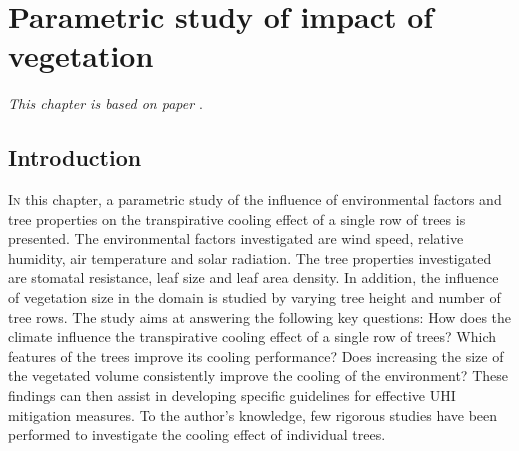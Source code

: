 \chapter{Parametric study of impact of vegetation}
\label{ch:parametricstudy}
\def\figdir{chapters/ch03_numericalmodelsimple/figures}

\textit{This chapter is based on paper \cite{Manickathan2018a}}.
	

\section{Introduction}


\lettrine[lines=3,nindent=0em,loversize=0.1]{I}{n} this chapter, a parametric study of the influence of environmental factors and tree properties on the transpirative cooling effect of a single row of trees is presented. The environmental factors investigated are wind speed, relative humidity, air temperature and solar radiation. The tree properties investigated are stomatal resistance, leaf size and leaf area density. In addition, the influence of vegetation size in the domain is studied by varying tree height and number of tree rows. The study aims at answering the following key questions: How does the climate influence the transpirative cooling effect of a single row of trees? Which features of the trees improve its cooling performance? Does increasing the size of the vegetated volume consistently improve the cooling of the environment? These findings can then assist in developing specific guidelines for effective UHI mitigation measures. To the author’s knowledge, few rigorous studies have been performed to investigate the cooling effect of individual trees. 


